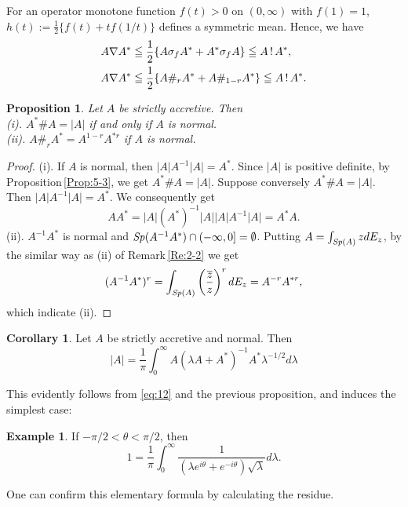 \documentclass[reqno]{amsart}
\newtheorem{proposition}[theorem]{Proposition}
\theoremstyle{definition}
\newtheorem{example}[theorem]{Example}
\newtheorem{corollary}[theorem]{Corollary}
\theoremstyle{remark}
\begin{document}
For an operator monotone function $f(t)>0$ on $(0, \infty)$ with $f(1) = 1$, 
$h(t):= \frac{1}{2}\{ f( t) + t f(1/t)\}$ defines a symmetric mean. Hence, we have 
\begin{align}
&A\nabla A^* \leqq  \frac{1}{2} \{ A \sigma _f  A^* + A^* \sigma _f  A \}
 \leqq A \,!\, A^*,\notag\\
&A\nabla A^* \leqq  \frac{1}{2} \{ A \#_r  A^* + A \#_{1-r} A^* \}
 \leqq A \,!\, A^*.\label{eq:14}
\end{align}
\begin{proposition}\label{Prop:6-2}
Let $A$ be strictly accretive. Then \\
(i). $A^* \# A = |A|$ if and only if $A$ is normal.\\
(ii). $A\#_r A^* = A ^{1-r} A^{*r}$ if $A$ is normal. 
\end{proposition}
\begin{proof} (i). 
If $A$ is normal, then $|A| A^{-1} |A|= A^*$. Since $|A|$ is positive definite, 
by Proposition\,\ref{Prop:5-3}, 
we get $A^* \# A = |A|$. Suppose conversely $A^* \# A = |A|$. Then 
$|A| A^{-1} |A| = A^*$. We consequently get
$$A A^*= |A| (A^*)^{-1}|A||A| A^{-1} |A| = A^* A.$$
(ii). $A^{-1}  A^*$ is normal and 
${\it Sp}(A^{-1} A^{*}) \cap (-\infty, 0] = \emptyset$. Putting 
$A=\int_{{\it Sp}(A)} z d E_z$, 
by the similar way as (ii) of Remark\,\ref{Re:2-2} we get 
$$(A^{-1}  A^*)^r = \int_{{\it Sp}(A)} \left(\frac{\overline{z}}{z}\right)^r d E_z = A^{-r} A^{*r},$$
which indicate (ii).
\end{proof}
\begin{corollary}\label{Cor:6-3}
Let $A$ be strictly accretive and normal. Then 
\begin{equation}\label{eq:15}
|A|=  \frac{1}{\pi}\int_0^{\infty}A (\lambda A + A^*)^{-1} A^* 
\lambda^{-1/2} d \lambda 
\end{equation}
 \end{corollary}
This evidently follows from \eqref{eq:12} and the previous proposition, and 
induces the simplest case:
\begin{example}
If $-\pi/2 < \theta < \pi/2$, then
$$1 = \frac{1}{\pi} \int_0^{\infty} \frac{1}{(\lambda e^{i\theta}  +  e^{-i\theta})
\sqrt{\lambda} } d \lambda.$$
\end{example}
One can confirm this elementary formula by calculating the residue.   
\end{document}

